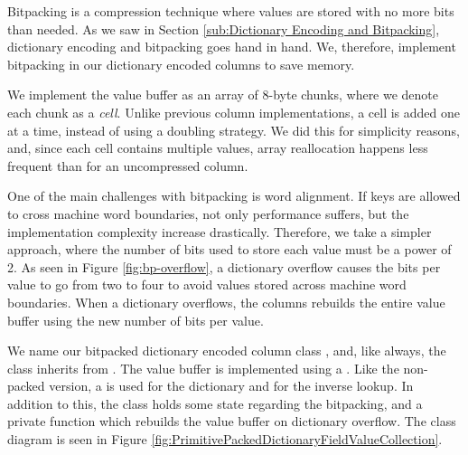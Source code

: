 Bitpacking is a compression technique where values are stored with no more bits than needed. As we saw in Section \ref{sub:Dictionary Encoding and Bitpacking}, dictionary encoding and bitpacking goes hand in hand. We, therefore, implement bitpacking in our dictionary encoded columns to save memory.

We implement the value buffer as an array of 8-byte chunks, where we denote each chunk as a \textit{cell}. Unlike previous column implementations, a cell is added one at a time, instead of using a doubling strategy. We did this for simplicity reasons, and, since each cell contains multiple values, array reallocation happens less frequent than for an uncompressed column.

One of the main challenges with bitpacking is word alignment. If keys are allowed to cross machine word boundaries, not only performance suffers, but the implementation complexity increase drastically. Therefore, we take a simpler approach, where the number of bits used to store each value must be a power of 2. As seen in Figure \ref{fig:bp-overflow}, a dictionary overflow causes the bits per value to go from two to four to avoid values stored across machine word boundaries. When a dictionary overflows, the columns rebuilds the entire value buffer using the new number of bits per value.

We name our bitpacked dictionary encoded column class , and, like always, the class inherits from . The value buffer is implemented using a . Like the non-packed version, a  is used for the dictionary and  for the inverse lookup. In addition to this, the class holds some state regarding the bitpacking, and a private function  which rebuilds the value buffer on dictionary overflow. The class diagram is seen in Figure \ref{fig:PrimitivePackedDictionaryFieldValueCollection}.

